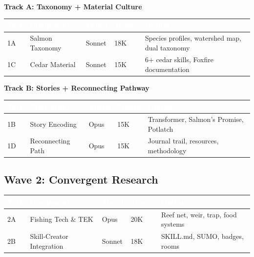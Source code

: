\documentclass[11pt,letterpaper]{article}
\newcommand{\tableheader}[1]{\textbf{\sffamily\textcolor{white}{#1}}}
\begin{document}
\textbf{Track A: Taxonomy + Material Culture}

\begin{center}
\begin{tabularx}{\textwidth}{C{0.8cm}L{3cm}C{1.5cm}C{1.5cm}X}
\toprule
{}
\tableheader{Task} & \tableheader{Component} & \tableheader{Model} & \tableheader{Tokens} & \tableheader{Output} \\
\midrule
1A & Salmon Taxonomy & Sonnet & 18K & Species profiles, watershed map, dual taxonomy \\
1C & Cedar Material & Sonnet & 15K & 6+ cedar skills, Foxfire documentation \\
\bottomrule
\end{tabularx}
\end{center}

\textbf{Track B: Stories + Reconnecting Pathway}

\begin{center}
\begin{tabularx}{\textwidth}{C{0.8cm}L{3cm}C{1.5cm}C{1.5cm}X}
\toprule
{}
\tableheader{Task} & \tableheader{Component} & \tableheader{Model} & \tableheader{Tokens} & \tableheader{Output} \\
\midrule
1B & Story Encoding & Opus & 15K & Transformer, Salmon's Promise, Potlatch \\
1D & Reconnecting Path & Opus & 15K & Journal trail, resources, methodology \\
\bottomrule
\end{tabularx}
\end{center}

\subsection{Wave 2: Convergent Research}

\begin{center}
\begin{tabularx}{\textwidth}{C{0.8cm}L{3.5cm}C{1.5cm}C{1.5cm}X}
\toprule
{}
\tableheader{Task} & \tableheader{Component} & \tableheader{Model} & \tableheader{Tokens} & \tableheader{Output} \\
\midrule
2A & Fishing Tech \& TEK & Opus & 20K & Reef net, weir, trap, food systems \\
2B & Skill-Creator Integration & Sonnet & 18K & SKILL.md, SUMO, badges, rooms \\
\bottomrule
\end{tabularx}
\end{center}
\end{document}
